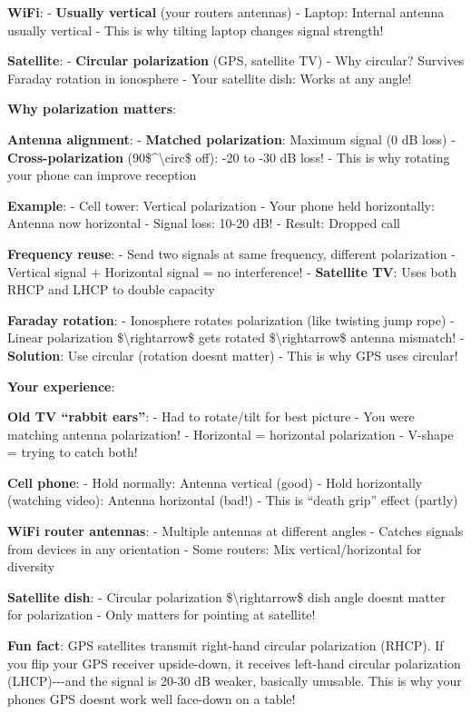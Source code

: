 \textbf{WiFi}: - \textbf{Usually vertical} (your
router\textquotesingle s antennas) - Laptop: Internal antenna usually
vertical - This is why tilting laptop changes signal strength!

\textbf{Satellite}: - \textbf{Circular polarization} (GPS, satellite TV)
- Why circular? Survives Faraday rotation in ionosphere - Your satellite
dish: Works at any angle!

\textbf{Why polarization matters}:

\textbf{Antenna alignment}: - \textbf{Matched polarization}: Maximum
signal (0 dB loss) - \textbf{Cross-polarization}
(90\$\^{}\textbackslash circ\$ off): -20 to -30 dB loss! - This is why
rotating your phone can improve reception

\textbf{Example}: - Cell tower: Vertical polarization - Your phone held
horizontally: Antenna now horizontal - Signal loss: 10-20 dB! - Result:
Dropped call

\textbf{Frequency reuse}: - Send two signals at same frequency,
different polarization - Vertical signal + Horizontal signal = no
interference! - \textbf{Satellite TV}: Uses both RHCP and LHCP to double
capacity

\textbf{Faraday rotation}: - Ionosphere rotates polarization (like
twisting jump rope) - Linear polarization \$\textbackslash rightarrow\$
gets rotated \$\textbackslash rightarrow\$ antenna mismatch! -
\textbf{Solution}: Use circular (rotation doesn\textquotesingle t
matter) - This is why GPS uses circular!

\textbf{Your experience}:

\textbf{Old TV ``rabbit ears''}: - Had to rotate/tilt for best picture -
You were matching antenna polarization! - Horizontal = horizontal
polarization - V-shape = trying to catch both!

\textbf{Cell phone}: - Hold normally: Antenna vertical (good) - Hold
horizontally (watching video): Antenna horizontal (bad!) - This is
``death grip'' effect (partly)

\textbf{WiFi router antennas}: - Multiple antennas at different angles -
Catches signals from devices in any orientation - Some routers: Mix
vertical/horizontal for diversity

\textbf{Satellite dish}: - Circular polarization
\$\textbackslash rightarrow\$ dish angle doesn\textquotesingle t matter
for polarization - Only matters for pointing at satellite!

\textbf{Fun fact}: GPS satellites transmit right-hand circular
polarization (RHCP). If you flip your GPS receiver upside-down, it
receives left-hand circular polarization (LHCP)-\/-\/-and the signal is
20-30 dB weaker, basically unusable. This is why your
phone\textquotesingle s GPS doesn\textquotesingle t work well face-down
on a table!

